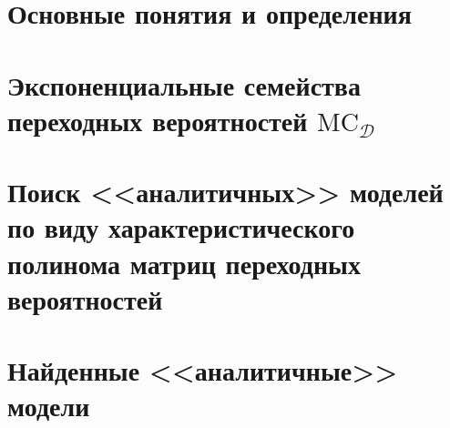 \documentclass[a4paper,12pt]{extarticle}
\begin{document}


\setcounter{page}{1}
\setcounter{tocdepth}{2}

\newcommand \ea {{1 - \alpha}}
\newcommand \al {\alpha}
\newcommand \MC {\mathrm{MC}}
\newcommand \la {{\lambda_\ast}}
\newcommand \ev {{\mathbf{v}_\ast}}

\section{Основные понятия и определения}



\section{Экспоненциальные семейства переходных вероят\-ностей \boldmath $\MC_\mathcal{D}$}



\section{Поиск <<аналитичных>> моделей по виду характеристического полинома матриц переходных вероятностей}



\section{Найденные <<аналитичные>> модели}


\end{document}
